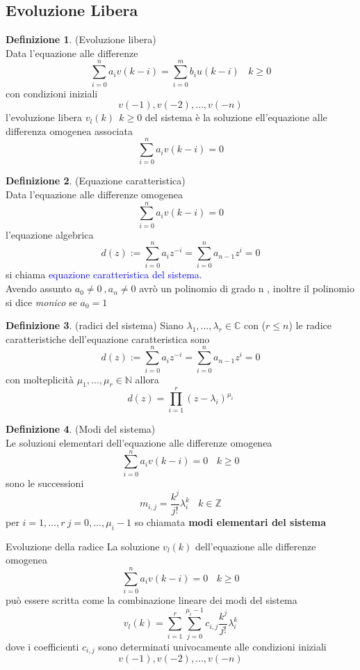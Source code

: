 \documentclass{article}
\theoremstyle{definition}
\newtheorem*{definizione}{Definizione}
\newcommand{\C}{\mathbb{C}}
\newcommand{\la}{\lambda}
\newcommand{\sisdiscro}{\sum_{i=0}^n a_iv(k-i)=\sum_{i=0}^m b_iu(k-i) \ \ \ \ k \geq 0}
\begin{document}
	\subsection{Evoluzione Libera}
	\begin{definizione}(Evoluzione libera) \\
		Data l'equazione alle differenze $$\sisdiscro$$ con condizioni iniziali $$v(-1),v(-2), \dots , v(-n)$$
l'evoluzione libera $v_l(k) \ \ k \geq 0$ del sistema è la soluzione ell'equazione alle differenza omogenea associata
$$\sum_{i=0}^{n}a_i v(k-i)=0$$
	\end{definizione}
	\begin{definizione}(Equazione caratteristica)\\
		Data l'equazione alle differenze omogenea
		$$\sum_{i=0}^{n}a_i v(k-i)=0$$
		l'equazione algebrica 
		$$d(z):=\sum_{i=0}^{n}a_iz^{-i}=\sum_{i=0}^{n}a_{n-1} z^i=0$$
		si chiama \textcolor{blue}{equazione caratteristica del sistema}. \\
		Avendo assunto $a_0\neq 0 \ , a_n \neq 0$ avrò un polinomio di grado n , inoltre il polinomio si dice \textit{monico} se $a_0=1$  
	\end{definizione}
	\begin{definizione}(radici del sistema)
		Siano $\la_1 , \dots , \la _r \in \C$ con ($r \leq n$) le radice caratteristiche dell'equazione caratteristica sono 
		$$d(z):=\sum_{i=0}^{n}a_iz^{-i}=\sum_{i=0}^{n}a_{n-1} z^i=0$$
		con molteplicità $\mu_1 , \dots , \mu_r \in \mathbb{N}$ allora 
		$$d(z)=\prod_{i=1}^r (z-\la_i)^{\mu_i}$$
	\end{definizione}
	\begin{definizione}(Modi del sistema)\\
		Le soluzioni elementari dell'equazione alle differenze omogenea
$$\sum_{i=0}^{n}a_i v(k-i)=0 \ \  \ \ k \geq 0$$
sono le successioni 
$$m_{i,j}=\frac{k^j}{j!}\la_i^k \ \ \ \ k \in \mathbb{Z}$$
per $i=1, \dots , r \ j=0,\dots , \mu_i-1$ so chiamata \textbf{modi elementari del sistema}
	\end{definizione}
	\begin{teo}{Evoluzione della radice}{}
		La soluzione $v_l(k)$ dell'equazione alle differenze omogenea 
		$$\sum_{i=0}^{n}a_i v(k-i)=0 \ \  \ \ k \geq 0$$ 
		può essere scritta come la combinazione lineare dei modi del sistema 
		$$v_l(k)=\sum_{i=1}^{r}\sum_{j=0}^{\mu_i-1}c_{i,j}\frac{k^j}{j!}\la_i^k$$
		dove i coefficienti $c_{i,j}$ sono determinati univocamente alle condizioni iniziali 
		$$v(-1),v(-2), \dots , v(-n)$$
	\end{teo}
\end{document}
